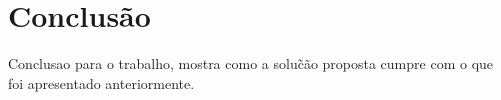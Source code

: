     \newpage
\chapter{Conclus\~ao}
Conclusao para o trabalho, mostra como a solu\~c\~ao proposta cumpre com o que foi apresentado anteriormente.